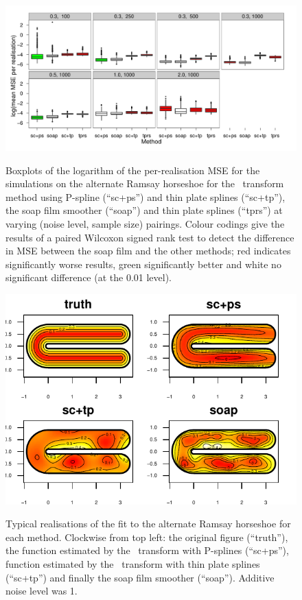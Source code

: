 \begin{figure}
\centering
\includegraphics{sc/tablecode/altramsay-boxplot.pdf} \\
\caption{Boxplots of the logarithm of the per-realisation MSE for the simulations on the alternate Ramsay horseshoe for the \sch\ transform method using P-spline (``sc+ps'') and thin plate splines (``sc+tp''), the soap film smoother (``soap'') and thin plate splines (``tprs'') at varying (noise level, sample size) pairings. Colour codings give the results of a paired Wilcoxon signed rank test to detect the difference in MSE between the soap film and the other methods; red indicates significantly worse results, green significantly better and white no significant difference (at the 0.01 level).}
\label{sc-altram-boxplot}
\end{figure}


\begin{figure}
\centering
\includegraphics[width=6in]{sc/figs/altramsaycomp.pdf}\\
\caption{Typical realisations of the fit to the alternate Ramsay horseshoe for each method. Clockwise from top left: the original figure (``truth''), the function estimated by the \sch\ transform with P-splines (``sc+ps''), function estimated by the \sch\ transform with thin plate splines (``sc+tp'') and finally the soap film smoother (``soap''). Additive noise level was 1.}
\label{altramsaycomp}
\end{figure}


